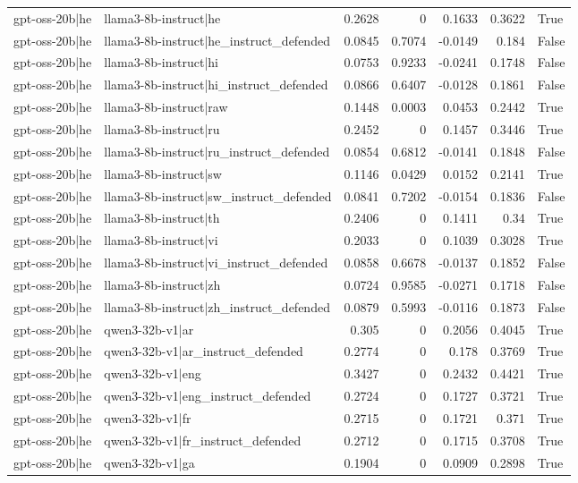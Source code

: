 \begin{table}
\begin{tabular}{l l r r r r l}
gpt-oss-20b|he & llama3-8b-instruct|he & 0.2628 & 0 & 0.1633 & 0.3622 & True \\
gpt-oss-20b|he & llama3-8b-instruct|he_instruct_defended & 0.0845 & 0.7074 & -0.0149 & 0.184 & False \\
gpt-oss-20b|he & llama3-8b-instruct|hi & 0.0753 & 0.9233 & -0.0241 & 0.1748 & False \\
gpt-oss-20b|he & llama3-8b-instruct|hi_instruct_defended & 0.0866 & 0.6407 & -0.0128 & 0.1861 & False \\
gpt-oss-20b|he & llama3-8b-instruct|raw & 0.1448 & 0.0003 & 0.0453 & 0.2442 & True \\
gpt-oss-20b|he & llama3-8b-instruct|ru & 0.2452 & 0 & 0.1457 & 0.3446 & True \\
gpt-oss-20b|he & llama3-8b-instruct|ru_instruct_defended & 0.0854 & 0.6812 & -0.0141 & 0.1848 & False \\
gpt-oss-20b|he & llama3-8b-instruct|sw & 0.1146 & 0.0429 & 0.0152 & 0.2141 & True \\
gpt-oss-20b|he & llama3-8b-instruct|sw_instruct_defended & 0.0841 & 0.7202 & -0.0154 & 0.1836 & False \\
gpt-oss-20b|he & llama3-8b-instruct|th & 0.2406 & 0 & 0.1411 & 0.34 & True \\
gpt-oss-20b|he & llama3-8b-instruct|vi & 0.2033 & 0 & 0.1039 & 0.3028 & True \\
gpt-oss-20b|he & llama3-8b-instruct|vi_instruct_defended & 0.0858 & 0.6678 & -0.0137 & 0.1852 & False \\
gpt-oss-20b|he & llama3-8b-instruct|zh & 0.0724 & 0.9585 & -0.0271 & 0.1718 & False \\
gpt-oss-20b|he & llama3-8b-instruct|zh_instruct_defended & 0.0879 & 0.5993 & -0.0116 & 0.1873 & False \\
gpt-oss-20b|he & qwen3-32b-v1|ar & 0.305 & 0 & 0.2056 & 0.4045 & True \\
gpt-oss-20b|he & qwen3-32b-v1|ar_instruct_defended & 0.2774 & 0 & 0.178 & 0.3769 & True \\
gpt-oss-20b|he & qwen3-32b-v1|eng & 0.3427 & 0 & 0.2432 & 0.4421 & True \\
gpt-oss-20b|he & qwen3-32b-v1|eng_instruct_defended & 0.2724 & 0 & 0.1727 & 0.3721 & True \\
gpt-oss-20b|he & qwen3-32b-v1|fr & 0.2715 & 0 & 0.1721 & 0.371 & True \\
gpt-oss-20b|he & qwen3-32b-v1|fr_instruct_defended & 0.2712 & 0 & 0.1715 & 0.3708 & True \\
gpt-oss-20b|he & qwen3-32b-v1|ga & 0.1904 & 0 & 0.0909 & 0.2898 & True \\

\end{tabular}
\end{table}
